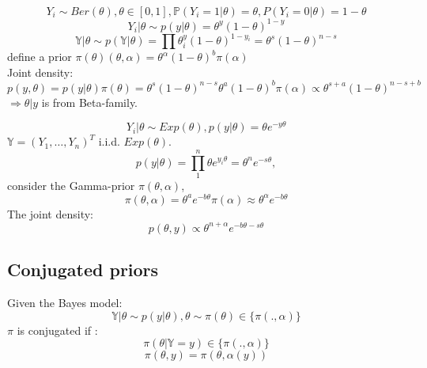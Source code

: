 \begin{example}[Bernolli]
\begin{equation*}
	Y_i \sim Ber(\theta), \theta \in [0, 1], \mathbb{P}(Y_i = 1 | \theta) = \theta, P(Y_i = 0|\theta) = 1 - \theta
\end{equation*}	
\begin{equation*}
	Y_i|\theta \sim p(y|\theta) = \theta^y (1 - \theta)^{1 - y}
\end{equation*}
\begin{equation*}
	\mathbb{Y} | \theta \sim p(\mathbb{Y} |\theta) = \prod \theta^y_i (1 - \theta)^{1 - y_i} = \theta^s ( 1 - \theta)^{n - s}
\end{equation*}
define a prior $\pi(\theta)(\theta, \alpha) = \theta^\alpha(1 - \theta)^b \pi(\alpha)$ \\
Joint density:
\begin{equation*}
	p(y, \theta) = p(y|\theta) \pi(\theta) = \theta^s (1 - \theta)^{n - s} \theta^a (1 - \theta)^b \pi(\alpha) \propto
	\theta^{s + a} (1 - \theta)^{n - s + b}
\end{equation*}
$\Rightarrow \theta|y$ is from Beta-family.
\end{example}

\begin{example}[Exponential]
\begin{equation*}
	Y_i | \theta \sim Exp(\theta), p(y|\theta)= \theta e^{-y \theta}
\end{equation*}	
$\mathbb{Y} = (Y_1, \dots, Y_n)^T$ i.i.d. $Exp(\theta)$.
\begin{equation*}
	p(y |\theta) = \prod_1^n \theta e^{y_i \theta} = \theta^n e^{-s\theta},
\end{equation*}
consider the Gamma-prior $\pi(\theta, \alpha)$, 
\begin{equation*}
	\pi(\theta, \alpha) = \theta^a e^{-b \theta} \pi(\alpha) \approx \theta^\alpha e^{-b\theta}
\end{equation*}
The joint density:
\begin{equation*}
	p(\theta, y) \propto \theta^{n + \alpha} e^{-b\theta-s\theta}
\end{equation*}
\end{example}

\subsection{Conjugated priors}
Given the Bayes model:
\begin{equation*}
	\mathbb{Y} |\theta \sim p(y | \theta), \theta \sim \pi(\theta) \in \{ \pi(., \alpha) \}
\end{equation*}
$\pi$ is conjugated if :
\begin{equation*}
	\pi(\theta| \mathbb{Y} = y) \in \{ \pi(., \alpha)\}
\end{equation*}
\begin{equation*}
	\pi(\theta, y) = \pi(\theta, \alpha(y))
\end{equation*}


